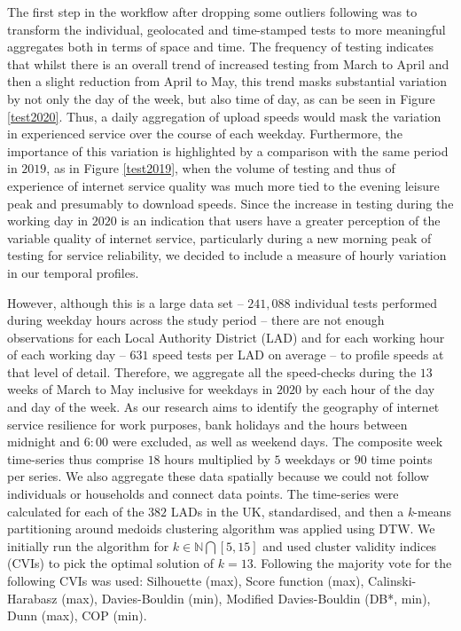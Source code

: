 \documentclass[,]{sagej}
\begin{document}
The first step in the workflow after dropping some outliers following
\citet{riddlesden2014broadband} was to transform the individual,
geolocated and time-stamped tests to more meaningful aggregates both in
terms of space and time. The frequency of testing indicates that whilst
there is an overall trend of increased testing from March to April and
then a slight reduction from April to May, this trend masks substantial
variation by not only the day of the week, but also time of day, as can
be seen in Figure \ref{test2020}. Thus, a daily aggregation of upload
speeds would mask the variation in experienced service over the course
of each weekday. Furthermore, the importance of this variation is
highlighted by a comparison with the same period in \(2019\), as in
Figure \ref{test2019}, when the volume of testing and thus of experience
of internet service quality was much more tied to the evening leisure
peak and presumably to download speeds. Since the increase in testing
during the working day in \(2020\) is an indication that users have a
greater perception of the variable quality of internet service,
particularly during a new morning peak of testing for service
reliability, we decided to include a measure of hourly variation in our
temporal profiles.

However, although this is a large data set -- \(241,088\) individual
tests performed during weekday hours across the study period -- there
are not enough observations for each Local Authority District (LAD) and
for each working hour of each working day -- \(631\) speed tests per LAD
on average -- to profile speeds at that level of detail. Therefore, we
aggregate all the speed-checks during the \(13\) weeks of March to May
inclusive for weekdays in \(2020\) by each hour of the day and day of
the week. As our research aims to identify the geography of internet
service resilience for work purposes, bank holidays and the hours
between midnight and \(6:00\) were excluded, as well as weekend days.
The composite week time-series thus comprise \(18\) hours multiplied by
\(5\) weekdays or \(90\) time points per series. We also aggregate these
data spatially because we could not follow individuals or households and
connect data points. The time-series were calculated for each of the
\(382\) LADs in the UK, standardised, and then a \emph{k}-means
partitioning around medoids clustering algorithm was applied using DTW.
We initially run the algorithm for \(k \in \mathbb{N} \bigcap [5,15]\)
and used cluster validity indices (CVIs) to pick the optimal solution of
\(k = 13\). Following \citet{sardatime} the majority vote for the
following CVIs was used: Silhouette (max), Score function (max),
Calinski-Harabasz (max), Davies-Bouldin (min), Modified Davies-Bouldin
(DB*, min), Dunn (max), COP (min).
\end{document}

